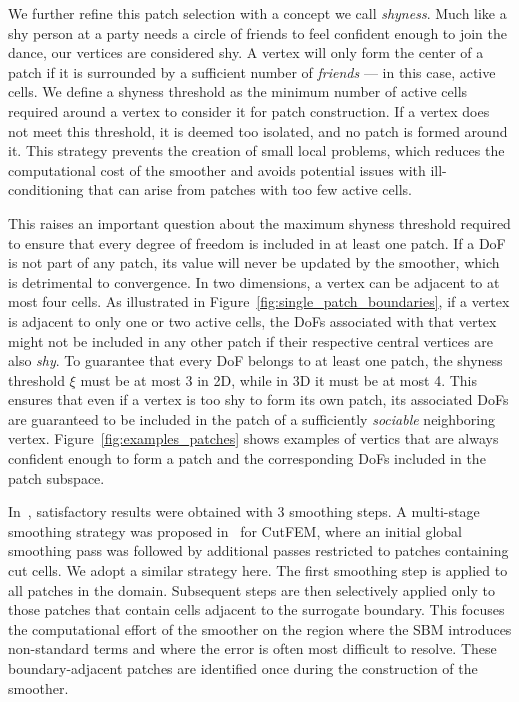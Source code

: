 \documentclass{elsarticle}
\begin{document}
We further refine this patch selection with a concept we call \emph{shyness}. Much like a shy person at a party needs a
circle of friends to feel confident enough to join the dance, our vertices are considered shy. A vertex will only form
the center of a patch if it is surrounded by a sufficient number of \emph{friends} --- in this case, active cells. We
define a shyness threshold as the minimum number of active cells required around a vertex to consider it for patch
construction. If a vertex does not meet this threshold, it is deemed too isolated, and no patch is formed around it.
This strategy prevents the creation of small local problems, which reduces the computational cost of the smoother and
avoids potential issues with ill-conditioning that can arise from patches with too few active cells.

This raises an important question about the maximum shyness threshold required to ensure that every degree of freedom
is included in at least one patch. If a DoF is not part of any patch, its value will never be updated by the smoother,
which is detrimental to convergence. In two dimensions, a vertex can be adjacent to at most four cells. As illustrated
in Figure~\ref{fig:single_patch_boundaries}, if a vertex is adjacent to only one or two active cells, the DoFs
associated with that vertex might not be included in any other patch if their respective central vertices are also
\emph{shy}. To guarantee that every DoF belongs to at least one patch, the shyness threshold $\xi$ must be at most 3 in
2D, while in 3D it must be at most 4. This ensures that even if a vertex is too shy to form its own patch, its
associated DoFs are guaranteed to be included in the patch of a sufficiently \emph{sociable} neighboring vertex.
Figure~\ref{fig:examples_patches} shows examples of vertics that are always confident enough to form a patch and the
corresponding DoFs included in the patch subspace.


In~\cite{wichrowski2025geometric}, satisfactory results were obtained with 3 smoothing steps. A multi-stage smoothing
strategy was proposed in~\cite{cui2025multigrid} for CutFEM, where an initial global smoothing pass was followed by
additional passes restricted to patches containing cut cells. We adopt a similar strategy here. The first smoothing
step is applied to all patches in the domain. Subsequent steps are then selectively applied only to those patches that
contain cells adjacent to the surrogate boundary. This focuses the computational effort of the smoother on the region
where the SBM introduces non-standard terms and where the error is often most difficult to resolve. These
boundary-adjacent patches are identified once during the construction of the smoother.
\end{document}
